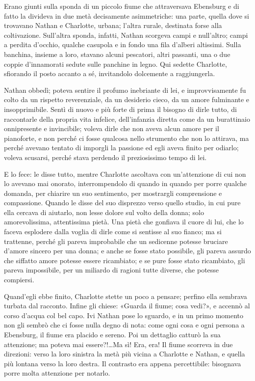 Erano giunti sulla sponda di un piccolo fiume che attraversava Ebensburg e di fatto la divideva in
due metà decisamente asimmetriche: una parte, quella dove si trovavano Nathan e Charlotte, urbana;
l'altra rurale, destinata forse alla coltivazione. Sull'altra sponda, infatti, Nathan scorgeva campi
e null'altro; campi a perdita d'occhio, qualche casupola e in fondo una fila d'alberi altissimi.
Sulla banchina, insieme a loro, stavano alcuni pescatori, altri passanti, una o due coppie
d'innamorati sedute sulle panchine in legno. Qui sedette Charlotte, sfiorando il posto accanto a sé,
invitandolo dolcemente a raggiungerla.

Nathan obbedì; poteva sentire il profumo inebriante di lei, e improvvisamente fu colto da un
rispetto reverenziale, da un desiderio cieco, da un amore fulminante e insopprimibile. Sentì di
nuovo e più forte di prima il bisogno di dirle tutto, di raccontarle della propria vita infelice,
dell'infanzia diretta come da un burattinaio onnipresente e invincibile; voleva dirle che non aveva
alcun amore per il pianoforte, e non perché ci fosse qualcosa nello strumento che non lo attirava,
ma perché avevano tentato di imporgli la passione ed egli aveva finito per odiarlo; voleva scusarsi,
perché stava perdendo il preziosissimo tempo di lei.

E lo fece: le disse tutto, mentre Charlotte ascoltava con un'attenzione di cui non lo avevano mai
onorato, interrompendolo di quando in quando per porre qualche domanda, per chiarire un suo
sentimento, per mostrargli comprensione e compassione. Quando le disse del suo disprezzo verso
quello studio, in cui pure ella cercava di aiutarlo, non lesse dolore sul volto della donna; solo
amorevolissima, attentissima pietà. Una pietà che gonfiava il cuore di lui, che lo faceva esplodere
dalla voglia di dirle come si sentisse al suo fianco; ma si trattenne, perché gli pareva improbabile
che un sedicenne potesse bruciare d'amore sincero per una donna; e anche se fosse stato possibile,
gli pareva assurdo che siffatto amore potesse essere ricambiato; e se pure fosse stato ricambiato,
gli pareva impossibile, per un miliardo di ragioni tutte diverse, che potesse compiersi.

Quand'egli ebbe finito, Charlotte stette un poco a pensare; perfino ella sembrava turbata dal
racconto. Infine gli chiese: «Guarda il fiume; cosa vedi?», e accennò al corso d'acqua col bel capo.
Ivi Nathan pose lo sguardo, e in un primo momento non gli sembrò che ci fosse nulla degno di nota:
come ogni cosa e ogni persona a Ebensburg, il fiume era placido e sereno. Poi un dettaglio catturò
la sua attenzione; ma poteva mai essere?!\dots Ma sì! Era, era! Il fiume scorreva in due direzioni:
verso la loro sinistra la metà più vicina a Charlotte e Nathan, e quella più lontana verso la loro
destra. Il contrasto era appena percettibile: bisognava porre molta attenzione per notarlo.

